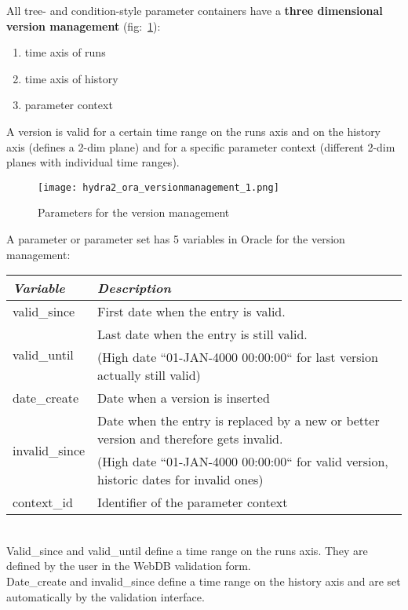 All tree- and condition-style parameter containers have a \textbf{three dimensional version management} 
(fig:~\ref{fig:oraVersionmanagementParameters}):
\begin{enumerate}
  \item time axis of runs
  \item time axis of history
  \item parameter context
\end{enumerate}
A version is valid for a certain time range on the runs axis and on the history axis (defines a 2-dim plane) and for a 
specific parameter context (different 2-dim planes with individual time ranges).\\

\begin{figure}[\htb]
  \centering
  \texttt{[image: hydra2\_ora\_versionmanagement\_1.png]}
  \caption[Parameters for the version management]{Parameters for the version management}
  \label{fig:oraVersionmanagementParameters}
\end{figure}

A parameter or parameter set has 5 variables in Oracle for the version management:\\
\begin{tabular}{|l|l|}
  \hline
  \cellcolor{lightgray} \textit{Variable} & \cellcolor{lightgray} \textit{Description}\\
  \hline
  valid\_since                    & First date when the entry is valid.\\
  \hline
  \multirow{2}{*}{valid\_until}   & Last date when the entry is still valid.\\
                                  & (High date ``01-JAN-4000 00:00:00`` for last version actually still valid)\\
  \hline
  date\_create                    & Date when a version is inserted\\
  \hline
  \multirow{2}{*}{invalid\_since} & Date when the entry is replaced by a new or better version and therefore gets invalid.\\
                                  & (High date ``01-JAN-4000 00:00:00`` for valid version, historic dates for invalid ones)\\
  \hline
  context\_id                     & Identifier of the parameter context\\
  \hline
\end{tabular}\\

Valid\_since and valid\_until define a time range on the runs axis. They are defined by the user in the WebDB validation form.\\
Date\_create and invalid\_since define a time range on the history axis and are set automatically by the validation interface.\\

